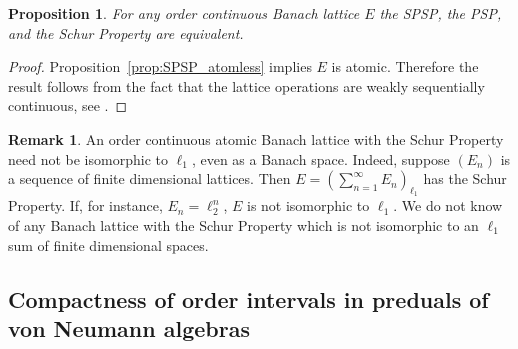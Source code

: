 \documentclass[12pt]{amsart}
\theoremstyle{plain}
\newtheorem{proposition}[theorem]{Proposition}
\theoremstyle{definition}
\newtheorem{remark}[theorem]{Remark}
\begin{document}


\begin{proposition}\label{prop:equiv_prop}
For any order continuous Banach lattice $E$ the SPSP, the PSP, and
the Schur Property are equivalent.
\end{proposition}

\begin{proof}
 Proposition~\ref{prop:SPSP_atomless} implies $E$ is atomic. Therefore
the result follows from the fact that the lattice operations are weakly
sequentially continuous, see  \cite[Proposition~2.5.23]{M-N}.
\end{proof}

\begin{remark}\label{rem:not l_1}
An order continuous atomic Banach lattice with the Schur Property need not
be isomorphic to $\ell_1$, even as a Banach space. Indeed, suppose
$(E_n)$ is a sequence of finite dimensional lattices. Then
$E = (\sum_{n=1}^\infty E_n)_{\ell_1}$ has the Schur Property.
If, for instance, $E_n = \ell_2^n$, $E$ is not isomorphic to $\ell_1$.
We do not know of any Banach lattice with the Schur Property
which is not isomorphic to an $\ell_1$ sum of finite dimensional spaces.
\end{remark}




\subsection{Compactness of order intervals in preduals of von Neumann algebras}
\label{ss:psp predual}
\end{document}
